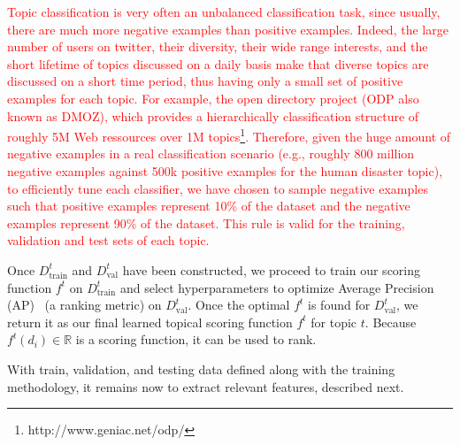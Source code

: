  \textcolor{red}{ Topic classification is very often an unbalanced classification task, since usually, there are much more negative examples than positive examples. Indeed, the large number of users on twitter, their diversity, their wide range interests, and the short lifetime of topics discussed on a daily basis make that  diverse topics are discussed on a short time period, thus having only a small set of positive examples for each topic. For example, the open directory project (ODP also known as DMOZ), which provides a hierarchically classification structure of roughly 5M Web ressources over 1M topics\footnote{http://www.geniac.net/odp/}. Therefore, given the huge amount of negative examples in a real classification scenario (e.g., roughly 800 million negative examples against 500k positive examples for the human disaster topic), to efficiently tune each classifier, we have chosen to sample negative examples such that positive examples represent 10\% of the dataset and the negative examples represent 90\% of the dataset. This rule is valid for the training, validation and test sets of each topic.
}




Once $D^t_\mathrm{train}$ and $D^t_\mathrm{val}$ have been constructed,
we proceed to train our scoring function $f^t$ on $D^t_\mathrm{train}$ and
select hyperparameters to optimize Average Precision (AP)~\cite{manning_ir} (a ranking
metric) on
$D^t_\mathrm{val}$.  Once the optimal $f^t$ is found for $D^t_\mathrm{val}$,
we return it as our final learned topical scoring function $f^t$ for topic $t$.
Because $f^t(d_i) \in \mathbb{R}$ is a scoring function, it can be used to rank.

With train, validation, and testing data defined along with the training methodology,
it remains now to extract relevant features, 
described next.




